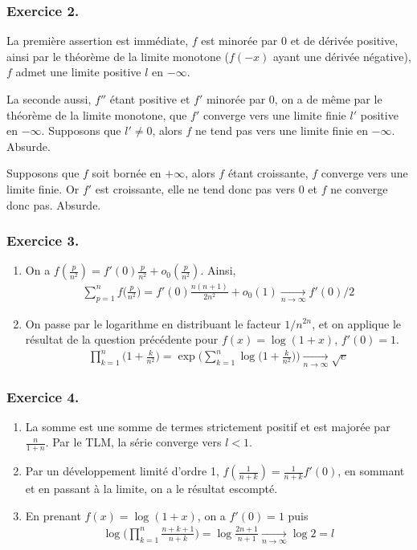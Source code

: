 \documentclass{article}
\begin{document}
\subsubsection*{Exercice 2.}
La première assertion est immédiate, $f$ est minorée par $0$ et de dérivée positive, ainsi par le théorème de la limite monotone ($f(-x)$ ayant une dérivée négative), $f$ admet une limite positive $l$ en $-\infty$.

La seconde aussi, $f''$ étant positive et $f'$ minorée par $0$, on a de même par le théorème de la limite monotone, que $f'$ converge vers une limite finie $l'$ positive en $-\infty$. Supposons que $l'\neq 0$, alors $f$ ne tend pas vers une limite finie en $-\infty$. Absurde. 

Supposons que $f$ soit bornée en $+\infty$, alors $f$ étant croissante, $f$ converge vers une limite finie. Or $f'$ est croissante, elle ne tend donc pas vers $0$ et $f$ ne converge donc pas. Absurde. 

\subsubsection*{Exercice 3.}
\begin{enumerate}
\item On a $f(\frac{p}{n^2})=f'(0)\frac{p}{n^2}+o_{0}(\frac{p}{n^2})$. Ainsi,
\begin{align*}
\sum_{p=1}^{n}f\bigg(\frac{p}{n^2}\bigg)=f'(0)\frac{n(n+1)}{2n^2}+o_{0}(1)\xrightarrow[n\to\infty]{} f'(0)/2
\end{align*}

\item On passe par le logarithme en distribuant le facteur $1/n^{2n}$, et on applique le résultat de la question précédente pour $f(x) = \log{(1+x)}$, $f'(0)=1$.
\begin{align*}
\prod_{k=1}^{n}{\bigg( 1+\frac{k}{n^2}\bigg)}=\exp \bigg( \sum_{k=1}^n \log\bigg({1+\frac{k}{n^2}}\bigg) \bigg)\xrightarrow[n\to\infty]{}  \sqrt{e}
\end{align*}
\end{enumerate}
\subsubsection*{Exercice 4.}
\begin{enumerate}
\item La somme est une somme de termes strictement positif et est majorée par $\frac{n}{1+n}$. Par le TLM, la série converge vers $l < 1$.
\item Par un développement limité d'ordre 1, $f(\frac{1}{n+k})=\frac{1}{n+k}f'(0)$, en sommant et en passant à la limite, on a le résultat escompté.
\item En prenant $f(x)=\log(1+x)$, on a $f'(0) = 1$ puis
\begin{align*}
\log \bigg(\prod_{k=1}^{n}{\frac{n+k+1}{n+k}}\bigg)=\log \frac{2n+1}{n+1}\xrightarrow[n\to\infty]{} \log 2 = l
\end{align*}
\end{enumerate}
\end{document}
